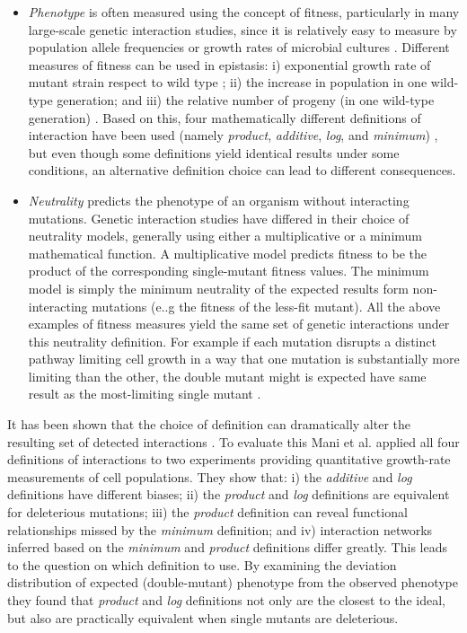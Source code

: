 \begin{itemize}
	\item \textit{Phenotype} is often measured using the concept of fitness, particularly in many large-scale genetic interaction studies, since it is relatively easy to measure by population allele frequencies or growth rates of microbial cultures \cite{mani2008defining}. 
Different measures of fitness can be used in epistasis: i) exponential growth rate of mutant strain respect to wild type ; ii) the increase in population in one wild-type generation; and iii) the relative number of progeny (in one wild-type generation) \cite{mani2008defining}.
Based on this, four mathematically different definitions of interaction have been used (namely \textit{product}, \textit{additive}, \textit{log}, and \textit{minimum}) \cite{mani2008defining}, but even though some definitions yield identical results under some conditions, an alternative definition choice can lead to different consequences\cite{mani2008defining}.

	\item \textit{Neutrality} predicts the phenotype of an organism without interacting mutations. 
Genetic interaction studies have differed in their choice of neutrality models, generally using either a multiplicative or a minimum mathematical function. A multiplicative model predicts fitness to be the product of the corresponding single-mutant fitness values. 
	The minimum model is simply the minimum neutrality of the expected results form non-interacting mutations (e..g the fitness of the less-fit mutant). 
All the above examples of fitness measures yield the same set of genetic interactions under this neutrality definition. 
For example if each mutation disrupts a distinct pathway limiting cell growth in a way that one mutation is substantially more limiting than the other, the double mutant might is expected have same result as the most-limiting single mutant \cite{mani2008defining}.
\end{itemize}

It has been shown that the choice of definition can dramatically alter the resulting set of detected interactions \cite{mani2008defining}.
To evaluate this Mani et al. \cite{mani2008defining} applied all four definitions of interactions to two experiments providing quantitative growth-rate measurements of cell populations. 
They show that: 
i) the \textit{additive} and \textit{log} definitions have different biases; 
ii) the \textit{product} and \textit{log} definitions are equivalent for deleterious mutations; 
iii) the \textit{product} definition can reveal functional relationships missed by the \textit{minimum} definition; and 
iv) interaction networks inferred based on the \textit{minimum} and \textit{product} definitions differ greatly. 
This leads to the question on which definition to use. 
By examining the deviation distribution of expected (double-mutant) phenotype from the observed phenotype they found that \textit{product} and \textit{log} definitions not only are the closest to the ideal, but also are practically equivalent when single mutants are deleterious.

